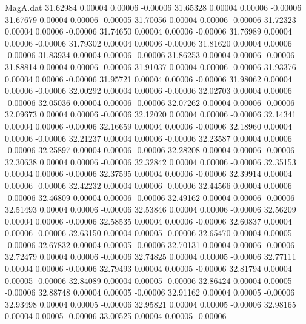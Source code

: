\begin{filecontents}{MagA.dat}
  31.62984    0.00004    0.00006   -0.00006
  31.65328    0.00004    0.00006   -0.00006
  31.67679    0.00004    0.00006   -0.00005
  31.70056    0.00004    0.00006   -0.00006
  31.72323    0.00004    0.00006   -0.00006
  31.74650    0.00004    0.00006   -0.00006
  31.76989    0.00004    0.00006   -0.00006
  31.79302    0.00004    0.00006   -0.00006
  31.81620    0.00004    0.00006   -0.00006
  31.83934    0.00004    0.00006   -0.00006
  31.86253    0.00004    0.00006   -0.00006
  31.88814    0.00004    0.00006   -0.00006
  31.91037    0.00004    0.00006   -0.00006
  31.93376    0.00004    0.00006   -0.00006
  31.95721    0.00004    0.00006   -0.00006
  31.98062    0.00004    0.00006   -0.00006
  32.00292    0.00004    0.00006   -0.00006
  32.02703    0.00004    0.00006   -0.00006
  32.05036    0.00004    0.00006   -0.00006
  32.07262    0.00004    0.00006   -0.00006
  32.09673    0.00004    0.00006   -0.00006
  32.12020    0.00004    0.00006   -0.00006
  32.14341    0.00004    0.00006   -0.00006
  32.16659    0.00004    0.00006   -0.00006
  32.18960    0.00004    0.00006   -0.00006
  32.21237    0.00004    0.00006   -0.00006
  32.23587    0.00004    0.00006   -0.00006
  32.25897    0.00004    0.00006   -0.00006
  32.28208    0.00004    0.00006   -0.00006
  32.30638    0.00004    0.00006   -0.00006
  32.32842    0.00004    0.00006   -0.00006
  32.35153    0.00004    0.00006   -0.00006
  32.37595    0.00004    0.00006   -0.00006
  32.39914    0.00004    0.00006   -0.00006
  32.42232    0.00004    0.00006   -0.00006
  32.44566    0.00004    0.00006   -0.00006
  32.46809    0.00004    0.00006   -0.00006
  32.49162    0.00004    0.00006   -0.00006
  32.51493    0.00004    0.00006   -0.00006
  32.53846    0.00004    0.00006   -0.00006
  32.56209    0.00004    0.00006   -0.00006
  32.58535    0.00004    0.00006   -0.00006
  32.60837    0.00004    0.00006   -0.00006
  32.63150    0.00004    0.00005   -0.00006
  32.65470    0.00004    0.00005   -0.00006
  32.67832    0.00004    0.00005   -0.00006
  32.70131    0.00004    0.00006   -0.00006
  32.72479    0.00004    0.00006   -0.00006
  32.74825    0.00004    0.00005   -0.00006
  32.77111    0.00004    0.00006   -0.00006
  32.79493    0.00004    0.00005   -0.00006
  32.81794    0.00004    0.00005   -0.00006
  32.84089    0.00004    0.00005   -0.00006
  32.86424    0.00004    0.00005   -0.00006
  32.88748    0.00004    0.00005   -0.00006
  32.91162    0.00004    0.00005   -0.00006
  32.93498    0.00004    0.00005   -0.00006
  32.95821    0.00004    0.00005   -0.00006
  32.98165    0.00004    0.00005   -0.00006
  33.00525    0.00004    0.00005   -0.00006

\end{filecontents}
